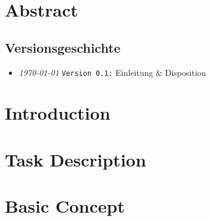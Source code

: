 \documentclass{fhnwreport/fhnwreport}
\begin{document}


\clearpage
\section*{Abstract}
\label{sec:abstract}



\clearpage
\pagestyle{empty}
{
    \renewcommand{\thispagestyle}[1]{}
    \tableofcontents
    \vspace{35mm}
    \subsection*{Versionsgeschichte}
    \begin{itemize}
        \item[]
            \emph{\today} \texttt{Version 0.1:} Einleitung \& Disposition
    \end{itemize}
}

\clearpage
\setcounter{page}{1}
\pagestyle{headings}

\clearpage
\section{Introduction}
\label{sec:introduction}


\clearpage
\section{Task Description}
\label{sec:task}



\clearpage
\section{Basic Concept}
\label{sec:concept}

\end{document}

